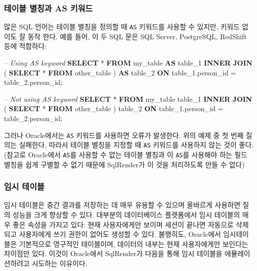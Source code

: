 \documentclass[11pt]{book}
\newenvironment{Shaded}{\begin{snugshade}}{\end{snugshade}}
\newcommand{\KeywordTok}[1]{\textcolor[rgb]{0.13,0.29,0.53}{\textbf{#1}}}
\newcommand{\DecValTok}[1]{\textcolor[rgb]{0.00,0.00,0.81}{#1}}
\newcommand{\CommentTok}[1]{\textcolor[rgb]{0.56,0.35,0.01}{\textit{#1}}}
\newcommand{\NormalTok}[1]{#1}
\theoremstyle{definition}
\theoremstyle{definition}
\theoremstyle{definition}
\theoremstyle{remark}
\begin{document}
\subsubsection*{테이블 별칭과 AS 키워드}\label{--as-}

많은 SQL 언어는 테이블 별칭을 정의할 때 \texttt{AS} 키워드를 사용할 수
있지만, 키워드 없이도 잘 동작 한다. 예를 들어, 이 두 SQL 문은 SQL
Server, PostgreSQL, RedShift 등에 적합하다:

\begin{Shaded}
\begin{Highlighting}[]
\CommentTok{-- Using AS keyword}
\KeywordTok{SELECT}\NormalTok{ * }
\KeywordTok{FROM}\NormalTok{ my_table }\KeywordTok{AS}\NormalTok{ table_}\DecValTok{1}
\KeywordTok{INNER} \KeywordTok{JOIN}\NormalTok{ (}
  \KeywordTok{SELECT}\NormalTok{ * }\KeywordTok{FROM}\NormalTok{ other_table}
\NormalTok{) }\KeywordTok{AS}\NormalTok{ table_}\DecValTok{2}
\KeywordTok{ON}\NormalTok{ table_1.person_id = table_2.person_id;}

\CommentTok{-- Not using AS keyword}
\KeywordTok{SELECT}\NormalTok{ * }
\KeywordTok{FROM}\NormalTok{ my_table table_}\DecValTok{1}
\KeywordTok{INNER} \KeywordTok{JOIN}\NormalTok{ (}
  \KeywordTok{SELECT}\NormalTok{ * }\KeywordTok{FROM}\NormalTok{ other_table}
\NormalTok{) table_}\DecValTok{2}
\KeywordTok{ON}\NormalTok{ table_1.person_id = table_2.person_id;}
\end{Highlighting}
\end{Shaded}

그러나 Oracle에서는 \texttt{AS} 키워드를 사용하면 오류가 발생한다. 위의
예제 중 첫 번째 질의는 실패한다. 따라서 테이블 별칭을 지정할 때
\texttt{AS} 키워드를 사용하지 않는 것이 좋다. (참고로 Oracle에서
\texttt{AS}를 사용할 수 없는 테이블 별칭과 이 \texttt{AS}를 사용해야
하는 필드 별칭을 쉽게 구별할 수 없기 때문에 SqlRender가 이 것을
처리하도록 만들 수 없다)

\subsubsection*{임시 테이블}\label{-}

임시 테이블은 중간 결과를 저장하는 데 매우 유용할 수 있으며 올바르게
사용하면 질의 성능을 크게 향상할 수 있다. 대부분의 데이터베이스
플랫폼에서 임시 테이블의 매우 좋은 속성을 가지고 있다: 현재 사용자에게만
보이며 세션이 끝나면 자동으로 삭제되고 사용자에게 쓰기 권한이 없어도
생성할 수 있다. 불행히도, Oracle에서 임시테이블은 기본적으로 영구적인
테이블이며, 데이터의 내부는 현재 사용자에게만 보인다는 차이점만 있다.
이것이 Oracle에서 SqlRender가 다음을 통해 임시 테이블을 에뮬레이션하려고
시도하는 이유이다.
\end{document}
